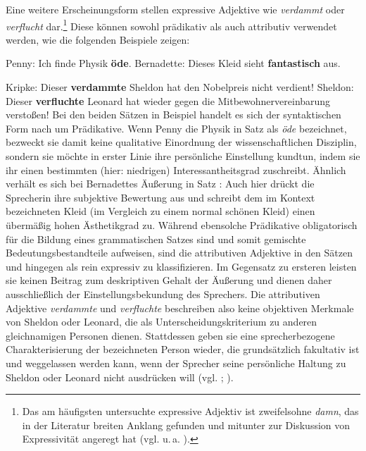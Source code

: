 
Eine weitere Erscheinungsform stellen expressive Adjektive wie \textit{verdammt} oder \textit{verflucht} dar.\footnote{Das am häufigsten untersuchte expressive Adjektiv ist zweifelsohne \textit{damn}, das in der Literatur breiten Anklang gefunden und mitunter zur Diskussion von Expressivität angeregt hat (vgl. u.\,a. \citealt[]{Potts.2005, Potts.2007a, Potts.2007b}).} Diese können sowohl prädikativ als auch attributiv verwendet werden, wie die folgenden Beispiele zeigen:

 \ea  \label{ExAd1}
 \ea Penny: \glqq{}Ich finde Physik \textbf{öde}.\grqq{} \label{penn}
 \ex Bernadette: \glqq{}Dieses Kleid sieht \textbf{fantastisch} aus.\grqq{} \label{bernadette1}
  \z
 \z

  \ea  \label{ExAd10}
 \ea Kripke: \glqq{}Dieser \textbf{verdammte} Sheldon hat den Nobelpreis nicht verdient!\grqq{} \label{kripke2}
 \ex Sheldon: \glqq{}Dieser \textbf{verfluchte} Leonard hat wieder gegen die Mitbewohnervereinbarung verstoßen!\grqq{} \label{sheld}
 \z
 \z
Bei den beiden Sätzen in Beispiel  handelt es sich der syntaktischen Form nach um Prädikative. Wenn Penny die Physik in Satz  als \textit{öde} bezeichnet, bezweckt sie damit keine qualitative Einordnung der wissenschaftlichen Disziplin, sondern sie möchte in erster Linie ihre persönliche Einstellung kundtun, indem sie ihr einen bestimmten (hier: niedrigen) Interessantheitsgrad zuschreibt. Ähnlich verhält es sich bei Bernadettes Äußerung in {Satz }: Auch hier drückt die Sprecherin ihre subjektive Bewertung aus und schreibt dem im Kontext bezeichneten Kleid (im Vergleich zu einem normal schönen Kleid) einen übermäßig hohen Ästhetikgrad zu. Während ebensolche Prädikative obligatorisch für die Bildung eines grammatischen Satzes sind und somit gemischte Bedeutungsbestandteile aufweisen, sind die attributiven Adjektive in den Sätzen  und  hingegen als rein expressiv zu klassifizieren. Im Gegensatz zu ersteren leisten sie keinen Beitrag zum deskriptiven Gehalt der Äußerung und dienen daher ausschließlich der Einstellungsbekundung des Sprechers. Die attributiven Adjektive \textit{verdammte} und \textit{verfluchte} beschreiben also keine objektiven Merkmale von Sheldon oder Leonard, die als Unterscheidungskriterium zu anderen gleichnamigen Personen dienen. Stattdessen geben sie eine sprecherbezogene Charakterisierung der bezeichneten Person wieder, die grundsätzlich fakultativ ist und weggelassen werden kann, wenn der Sprecher seine persönliche Haltung zu Sheldon oder Leonard nicht ausdrücken will (vgl. \citealt[18]{Potts.2005}; {\citealt[131]{Gutzmann.2011}}).

